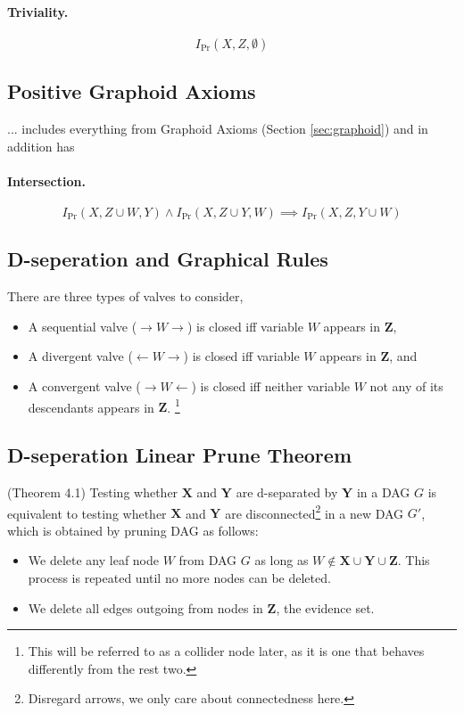 \documentclass[11pt]{article}
\newcommand{\pr}{\mathrm{Pr}}
\begin{document}
\paragraph{Triviality.}
\begin{equation}
	I_\pr (X, Z, \emptyset) 
\end{equation}

\subsection{Positive Graphoid Axioms}
... includes everything from Graphoid Axioms (Section \ref{sec:graphoid}) and in addition has 
\paragraph{Intersection.}
\begin{equation}
	I _ \pr (X, Z \cup W, Y ) \land I _\pr (X, Z \cup Y , W ) \implies I _\pr (X, Z, Y \cup W)
\end{equation}

\subsection{D-seperation and Graphical Rules}
There are three types of valves to consider, 
\begin{itemize}
	\item A sequential valve ($\rightarrow W \rightarrow$) is closed iff variable $W$ appears in $\mathbf Z$, 
	\item A divergent valve ($\leftarrow W \rightarrow$) is closed iff variable $W$ appears in $\mathbf Z$, and 
	\item A convergent valve ($\rightarrow W \leftarrow$) is closed iff neither variable $W$ not any of its descendants appears in $\mathbf Z$. \footnote{This will be referred to as a collider node later, as it is one that behaves differently from the rest two.}
\end{itemize}

\subsection{D-seperation Linear Prune Theorem}
(Theorem 4.1) Testing whether $\mathbf X$ and $\mathbf Y$ are d-separated by $\mathbf Y$ in a DAG $G$ is equivalent to testing whether $\mathbf X$ and $\mathbf Y$ are disconnected\footnote{Disregard arrows, we only care about connectedness here.} in a new DAG $G'$, which is obtained by pruning DAG as follows: 
\begin{itemize}
	\item We delete any leaf node $W$ from DAG $G$ as long as $W\not \in \mathbf X\cup \mathbf Y \cup \mathbf Z$. This process is repeated until no more nodes can be deleted. 
	\item We delete all edges outgoing from nodes in $\mathbf Z$, the evidence set. 
\end{itemize}
\end{document}
